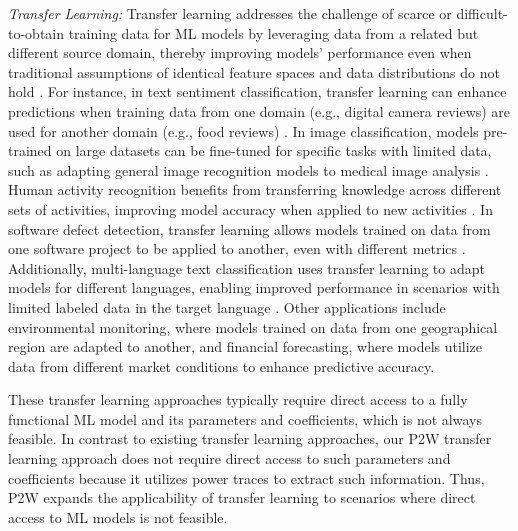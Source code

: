 \emph{Transfer Learning:}
Transfer learning addresses the challenge of scarce or difficult-to-obtain training data for ML models by leveraging data from a related but different source domain, thereby improving models' performance even when traditional assumptions of identical feature spaces and data distributions do not hold \cite{Weiss2016}. For instance, in text sentiment classification, transfer learning can enhance predictions when training data from one domain (e.g., digital camera reviews) are used for another domain (e.g., food reviews) \cite{5288526}. In image classification, models pre-trained on large datasets can be fine-tuned for specific tasks with limited data, such as adapting general image recognition models to medical image analysis \cite{10.1109/CVPR.2011.5995702, Zhu_Chen_Lu_Pan_Xue_Yu_Yang_2011}. Human activity recognition benefits from transferring knowledge across different sets of activities, improving model accuracy when applied to new activities \cite{10.5555/3104482.3104533}. In software defect detection, transfer learning allows models trained on data from one software project to be applied to another, even with different metrics \cite{10.1145/2786805.2786814}. Additionally, multi-language text classification uses transfer learning to adapt models for different languages, enabling improved performance in scenarios with limited labeled data in the target language \cite{JMLR:v20:13-580, Zhou_Pan_Tsang_Yan_2014}. Other applications include environmental monitoring, where models trained on data from one geographical region are adapted to another, and financial forecasting, where models utilize data from different market conditions to enhance predictive accuracy.

These transfer learning approaches typically require direct access to a fully functional ML model and its parameters and coefficients, which is not always feasible. In contrast to existing transfer learning approaches, our P2W transfer learning approach does not require direct access to such parameters and coefficients because it utilizes power traces to extract such information. Thus, P2W expands the applicability of transfer learning to scenarios where direct access to ML models is not feasible.